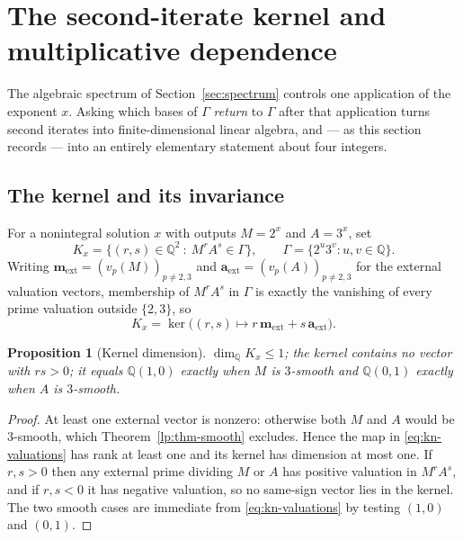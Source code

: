 \documentclass[11pt,oneside]{article}
\newtheorem{proposition}[theorem]{Proposition}
\theoremstyle{definition}
\theoremstyle{remark}
\newcommand{\Q}{\mathbb Q}
\newcommand{\vpp}[2]{v_{#1}\!\left(#2\right)}
\newcommand{\GammaSat}{\Gamma}
\begin{document}
\section{The second-iterate kernel and multiplicative dependence}
\label{sec:kernel}

The algebraic spectrum of Section~\ref{sec:spectrum} controls one application of the exponent
$x$.  Asking which bases of $\GammaSat$ \emph{return} to $\GammaSat$ after that application
turns second iterates into finite-dimensional linear algebra, and --- as this section records
--- into an entirely elementary statement about four integers.

\subsection{The kernel and its invariance}

For a nonintegral solution $x$ with outputs $M=2^x$ and $A=3^x$, set
\begin{equation}
  K_x=\bigl\{(r,s)\in\Q^2\ :\ M^rA^s\in\GammaSat\bigr\},
  \qquad \GammaSat=\{2^u3^v:u,v\in\Q\}.
  \label{eq:kn-def}
\end{equation}
Writing $\mathbf m_{\mathrm{ext}}=(\vpp pM)_{p\ne2,3}$ and
$\mathbf a_{\mathrm{ext}}=(\vpp pA)_{p\ne2,3}$ for the external valuation vectors, membership
of $M^rA^s$ in $\GammaSat$ is exactly the vanishing of every prime valuation outside
$\{2,3\}$, so
\begin{equation}
  K_x=\ker\bigl((r,s)\mapsto r\,\mathbf m_{\mathrm{ext}}+s\,\mathbf a_{\mathrm{ext}}\bigr).
  \label{eq:kn-valuations}
\end{equation}

\begin{proposition}[Kernel dimension]
\label{kn:prop-dim}
$\dim_\Q K_x\le1$; the kernel contains no vector with $rs>0$; it equals $\Q(1,0)$ exactly
when $M$ is $3$-smooth and $\Q(0,1)$ exactly when $A$ is $3$-smooth.
\end{proposition}

\begin{proof}
At least one external vector is nonzero: otherwise both $M$ and $A$ would be $3$-smooth,
which Theorem~\ref{lp:thm-smooth} excludes.  Hence the map in \eqref{eq:kn-valuations} has
rank at least one and its kernel has dimension at most one.  If $r,s>0$ then any external
prime dividing $M$ or $A$ has positive valuation in $M^rA^s$, and if $r,s<0$ it has negative
valuation, so no same-sign vector lies in the kernel.  The two smooth cases are immediate
from \eqref{eq:kn-valuations} by testing $(1,0)$ and $(0,1)$.
\end{proof}
\end{document}
